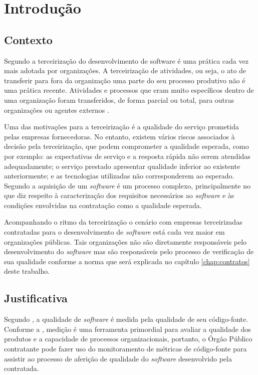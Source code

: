 \chapter{Introdução}
\label{chap:introdução} 

\section{Contexto}

Segundo\cite{WillcocksTercerizacao} a terceirização do desenvolvimento de software é uma prática cada vez mais adotada por organizações. A terceirização de atividades, ou seja, o ato de transferir para fora da organização uma parte do seu processo produtivo não é uma prática recente. Atividades e processos que eram muito específicos dentro de uma organização foram transferidos, de forma parcial ou total, para outras organizações ou agentes externos \cite{leite_terceirizacao}.

Uma das motivações para a terceirização é a qualidade do serviço prometida pelas empresas fornecedoras. No entanto, existem vários riscos associados à decisão pela terceirização, que podem comprometer a qualidade esperada, como por exemplo: as expectativas de serviço e a resposta rápida não serem atendidas adequadamente; o serviço prestado apresentar qualidade inferior ao existente anteriormente; e as tecnologias utilizadas não corresponderem ao esperado\cite{WillcocksTercerizacao}. Segundo  a aquisição de um \textit {software} é um processo complexo, principalmente no que diz respeito à caracterização dos requisitos necessários ao \textit {software} e às condições envolvidas na contratação como a qualidade esperada. 
 
Acompanhando o ritmo da terceirização o cenário com empresas terceirizadas contratadas para o desenvolvimento de \textit {software} está cada vez maior em organizações públicas. Tais organizações não são diretamente responsáveis pelo desenvolvimento do \textit {software} mas são responsáveis  pelo processo de verificação de sua qualidade conforme a norma \cite{Normativa4} que será explicada no capítulo \ref{chap:contratos} deste trabalho.


\section{Justificativa}

Segundo \cite{beck1999}\cite{fowler1999refactoring}, a qualidade de \textit{software} é medida pela qualidade de seu código-fonte. Conforme a \cite{ISO:15939}, medição é uma ferramenta primordial para avaliar a qualidade dos produtos e a capacidade de processos organizacionais, portanto, o Órgão Público contratante pode fazer uso do monitoramento de métricas de código-fonte para assistir ao processo de aferição de qualidade do \textit{software} desenvolvido pela contratada.

